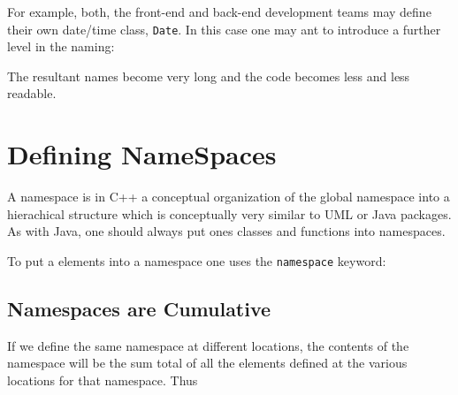 For example, both, the front-end and back-end development teams
may define their own date/time class, \verb+Date+. In this case
one may ant to introduce a further level in the naming:




The resultant names become very long and the code becomes less and 
less readable. 


\section{Defining NameSpaces}

A namespace is in C++ a conceptual organization of the global 
namespace into a hierachical structure which is conceptually
very similar to UML or Java packages. As with Java, one should
always put ones classes and functions into namespaces. 

To put a elements into a namespace one uses the \verb+namespace+
keyword:



\subsection{Namespaces are Cumulative}

If we define the same namespace at different locations, the contents
of the namespace will be the sum total of all the elements defined
at the various locations for that namespace. Thus


